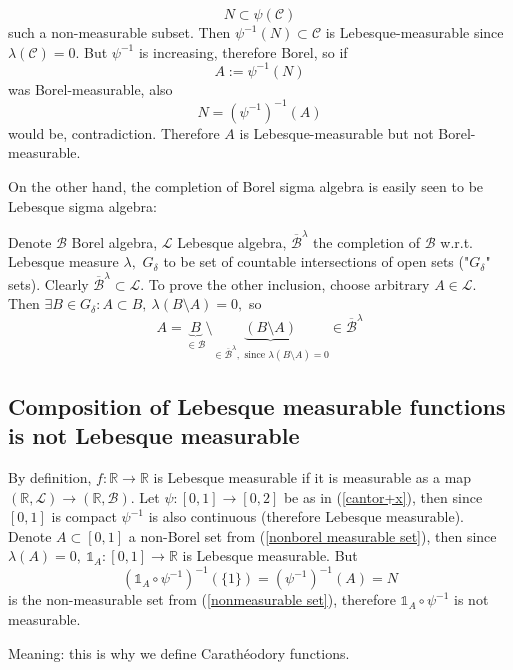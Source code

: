 \documentclass[12pt,a4paper]{article}
\renewcommand\:{\colon}
\begin{document}
\begin{equation}\label{nonmeasurable set}
  N\subset \psi(\mathcal{C})
\end{equation} such a non-measurable subset. Then $\psi^{-1}(N)\subset \mathcal{C}$ is Lebesque-measurable since $\lambda(\mathcal{C})=0.$ But $\psi^{-1}$ is increasing, therefore Borel, so if 
\begin{equation}\label{nonborel measurable set}
  A:= \psi^{-1}(N) 
\end{equation}
was Borel-measurable, also
\begin{equation*}
  N = (\psi^{-1})^{-1}(A)
\end{equation*}
would be, contradiction. Therefore $A$ is Lebesque-measurable but not Borel-measurable.
\vspace{.3cm} 
\par On the other hand, the completion of Borel sigma algebra is easily seen to be Lebesque sigma algebra:
\par Denote $\mathcal{B}$ Borel algebra, $\mathcal{L}$ Lebesque algebra, $\overline{\mathcal{B}}^\lambda$ the completion of $\mathcal{B}$ w.r.t. Lebesque measure $\lambda,$ $G_\delta$ to be set of countable intersections of open sets ("$G_\delta$" sets). Clearly $\overline{\mathcal{B}}^\lambda\subset \mathcal{L}.$ To prove the other inclusion, choose arbitrary $A\in \mathcal{L}.$ Then $\exists B\in G_\delta\: A\subset B, \ \lambda(B\setminus A)=0,$ so
\begin{equation*}
	A = \underbrace{B}_{\in \mathcal{B}}\setminus \underbrace{(B\setminus A)}_{\in \overline{\mathcal{B}}^\lambda, \text{ since } \lambda(B\setminus A)=0}\in \overline{\mathcal{B}}^\lambda
\end{equation*}

\subsection{Composition of Lebesque measurable functions is not Lebesque measurable}
By definition, $f\: \mathbb{R}\to \mathbb{R}$ is Lebesque measurable if it is measurable as a map $(\mathbb{R},\mathcal{L})\to (\mathbb{R}, \mathcal{B}).$ Let $\psi\: [0,1]\to [0,2]$ be as in (\ref{cantor+x}), then since $[0,1]$ is compact $\psi^{-1}$ is also continuous (therefore Lebesque measurable). Denote $A\subset[0,1]$ a non-Borel set from (\ref{nonborel measurable set}), then since $\lambda(A)=0,\ \mathbb{1}_A\: [0,1]\to \mathbb{R}$ is Lebesque measurable. But
\begin{equation*}
	(\mathbb{1}_A\circ \psi^{-1})^{-1}(\{1\})=(\psi^{-1})^{-1}(A)=N
\end{equation*}
is the non-measurable set from (\ref{nonmeasurable set}), therefore $\mathbb{1}_A\circ \psi^{-1}$ is not measurable.
\par Meaning: this is why we define Carathéodory functions.
\end{document}
